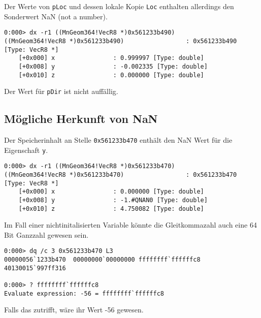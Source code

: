 Der Werte von \verb|pLoc| und dessen lokale Kopie \verb|Loc| enthalten allerdings den Sonderwert NaN (not a number).

\begin{lstlisting}
0:000> dx -r1 ((MnGeom364!VecR8 *)0x561233b490)
((MnGeom364!VecR8 *)0x561233b490)                 : 0x561233b490 [Type: VecR8 *]
    [+0x000] x                : 0.999997 [Type: double]
    [+0x008] y                : -0.002335 [Type: double]
    [+0x010] z                : 0.000000 [Type: double]
\end{lstlisting}

Der Wert für \verb|pDir| ist nicht auffällig.

\subsection{Mögliche Herkunft von NaN}

Der Speicherinhalt an Stelle \verb|0x561233b470| enthält den NaN Wert für die Eigenschaft \verb|y|.

\begin{lstlisting}
0:000> dx -r1 ((MnGeom364!VecR8 *)0x561233b470)
((MnGeom364!VecR8 *)0x561233b470)                 : 0x561233b470 [Type: VecR8 *]
    [+0x000] x                : 0.000000 [Type: double]
    [+0x008] y                : -1.#QNAN0 [Type: double]
    [+0x010] z                : 4.750082 [Type: double]
\end{lstlisting}

Im Fall einer nichtinitalisierten Variable könnte die Gleitkommazahl auch eine 64 Bit Ganzzahl gewesen sein.

\begin{lstlisting}
0:000> dq /c 3 0x561233b470 L3
00000056`1233b470  00000000`00000000 ffffffff`ffffffc8 40130015`997ff316

0:000> ? ffffffff`ffffffc8
Evaluate expression: -56 = ffffffff`ffffffc8
\end{lstlisting}

Falls das zutrifft, wäre ihr Wert -56 gewesen.